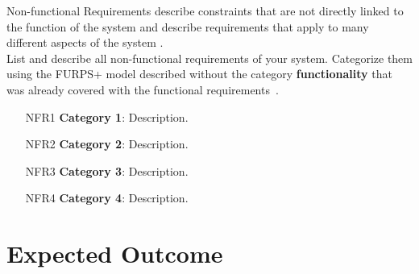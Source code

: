 \documentclass[
	pdftex,
	letterpaper,
	titlepage,
	final,
	oneside,
	11pt,
	DIV=calc,
]{scrbook}
\begin{document}
\begin{tcolorbox}[breakable]
	Non-functional Requirements describe constraints that are not directly linked to the function of the system and describe requirements that apply to many different aspects of the system \cite{bruegge2013object}.
	\\
	List and describe all non-functional requirements of your system.
	Categorize them using the FURPS+ model described without the category \textbf{functionality} that was already covered with the functional requirements~\cite{bruegge2013object}. 
\end{tcolorbox}

\begin{itemize}[itemindent=-13pt, leftmargin=43pt, align=left]
    \item[NFR1] \textbf{Category 1}: Description.
    \item[NFR2] \textbf{Category 2}: Description.
    \item[NFR3] \textbf{Category 3}: Description.
    \item[NFR4] \textbf{Category 4}: Description.
\end{itemize}


\section*{Expected Outcome}
\end{document}
